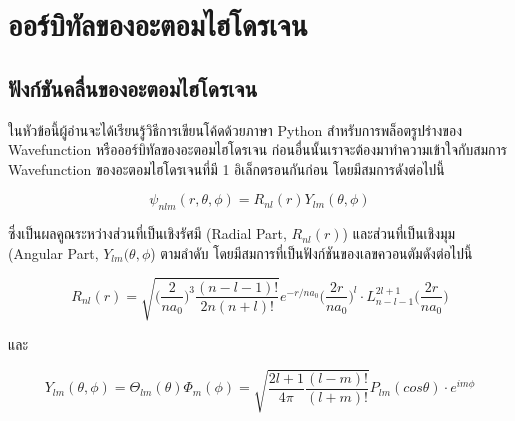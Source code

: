 

\chapter{ออร์บิทัลของอะตอมไฮโดรเจน}
\label{ch:hydro_orbitals}

\section{ฟังก์ชันคลื่นของอะตอมไฮโดรเจน}
\label{sec:hydro_wfn}

ในหัวข้อนี้ผู้อ่านจะได้เรียนรู้วิธีการเขียนโค้ดด้วยภาษา Python สำหรับการพล็อตรูปร่างของ Wavefunction หรือออร์บิทัลของอะตอมไฮโดรเจน 
ก่อนอื่นนั้นเราจะต้องมาทำความเข้าใจกับสมการ Wavefunction ของอะตอมไฮโดรเจนที่มี 1 อิเล็กตรอนกันก่อน โดยมีสมการดังต่อไปนี้

\begin{equation}\label{eq:hydro_wfn}
    \psi_{nlm}(r,\theta,\phi) = R_{nl}(r) Y_{lm}(\theta,\phi)
\end{equation}

\noindent ซึ่งเป็นผลคูณระหว่างส่วนที่เป็นเชิงรัศมี (Radial Part, $R_{nl}(r)$) และส่วนที่เป็นเชิงมุม (Angular Part, $Y_{lm}(\theta, 
\phi$) ตามลำดับ โดยมีสมการที่เป็นฟังก์ชันของเลขควอนตัมดังต่อไปนี้

\begin{equation}\label{eq:hydro_wfn_rad}
R_{nl}(r) = \sqrt{\Big(\frac{2}{n a_0}\Big)^3 \frac{(n-l-1)!}{2n (n+l)!}} e^{-r/n a_0} 
    \Big( \frac{2r}{na_0}\Big)^l  \cdot L^{2l+1}_{n-l-1} \Big(\frac{2r}{n a_0} \Big)
\end{equation}

\noindent และ

\begin{equation}\label{eq:hydro_wfn_ang}
Y_{lm}(\theta,\phi) = \Theta_{lm}(\theta) \Phi_m (\phi) = \sqrt{\frac{2l+1}{4\pi} \frac{(l-m)!}{(l+m)!} } 
    P_{lm}(cos \theta) \cdot e^{im\phi}
\end{equation}

